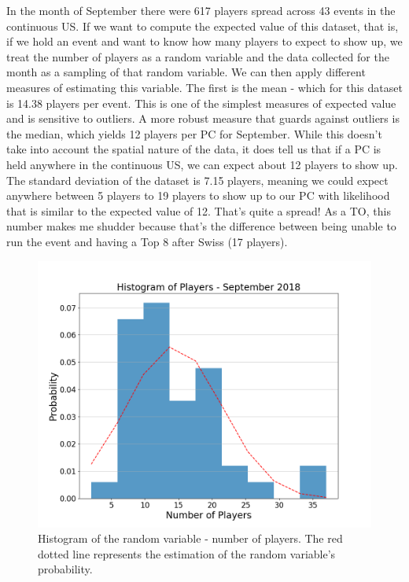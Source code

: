 \documentclass[11pt,twocolumn]{article}
\begin{document}
In the month of September there were 617 players spread across 43 events in the continuous US. If we want to compute the expected value of this dataset, that is, if we hold an event and want to know how many players to expect to show up, we treat the number of players as a random variable and the data collected for the month as a sampling of that random variable. We can then apply different measures of estimating this variable. The first is the mean - which for this dataset is 14.38 players per event. This is one of the simplest measures of expected value and is sensitive to outliers. A more robust measure that guards against outliers is the median, which yields 12 players per PC for September. While this doesn't take into account the spatial nature of the data, it does tell us that if a PC is held anywhere in the continuous US, we can expect about 12 players to show up. The standard deviation of the dataset is 7.15 players, meaning we could expect anywhere between 5 players to 19 players to show up to our PC with likelihood that is similar to the expected value of 12. That's quite a spread! As a TO, this number makes me shudder because that's the difference between being unable to run the event and having a Top 8 after Swiss (17 players). 

\begin{figure}[h]
\includegraphics[width=\columnwidth]{../figs/Figure_1.png}
\caption{Histogram of the random variable - number of players. The red dotted line represents the estimation of the random variable's probability.}
\label{fig1}
\end{figure}
\end{document}
